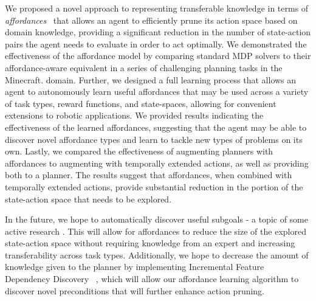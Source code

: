 \documentclass[conference]{IEEEtran}
\begin{document}
We proposed a novel approach to representing transferable knowledge in terms of
{\em affordances}~\cite{gibson77} that allows an agent to efficiently
prune its action space based on domain knowledge,
providing a significant reduction in the number of state-action pairs the
agent needs to evaluate in order to act optimally. We demonstrated the effectiveness of the affordance model by comparing standard MDP solvers
to their affordance-aware equivalent in a series of challenging planning tasks in the Minecraft.
domain. Further, we designed a full learning process that allows an agent to autonomously learn useful affordances that may be used
across a variety of task types, reward functions, and state-spaces, allowing for convenient extensions to robotic applications.
We provided results indicating the effectiveness of the learned affordances, suggesting that the agent may be able to discover novel affordance types and learn to tackle new types of problems on its own.
Lastly, we compared the effectiveness of augmenting planners with affordances to augmenting with temporally extended actions, as well as providing both to a planner. The results suggest that affordances, when combined with temporally extended actions, provide substantial reduction in the portion of the state-action space that needs to be explored.

In the future, we hope to automatically discover useful subgoals - a topic of some active research \cite{Mcgovern01automaticdiscovery,Simsek:2005:IUS:1102351.1102454}. This will allow for affordances to reduce the size of the explored state-action space without requiring knowledge from an expert and increasing transferability across task types. Additionally, we hope to decrease the amount of knowledge given to the planner by implementing Incremental Feature Dependency Discovery ~\cite{ICML2011Geramifard_473}, which will allow our affordance learning algorithm to discover novel preconditions that will further enhance action pruning.


{\small


}
\end{document}
